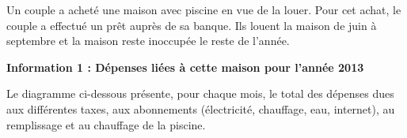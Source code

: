 \documentclass[10pt]{article}
\begin{document}
\setlength\parindent{0mm}
\pagestyle{fancy}
\thispagestyle{empty}
    
    
    




\bigskip
 
Un couple a acheté une maison avec piscine en vue de la louer. Pour cet achat, le couple a effectué un prêt auprès de sa banque. Ils louent la maison de juin à septembre et la maison reste inoccupée le reste de l'année.

\medskip
 
\textbf{Information 1 : Dépenses liées à cette maison pour l'année 2013}

\medskip
 
Le diagramme ci-dessous présente, pour chaque mois, le total des dépenses dues aux différentes taxes, aux abonnements (électricité, chauffage, eau, internet), au remplissage et au chauffage de la piscine.
 
\end{document}

